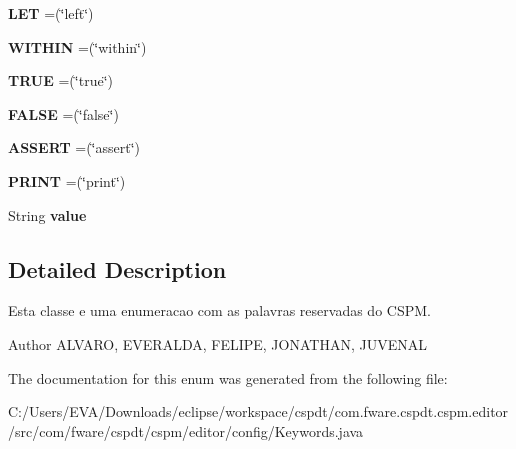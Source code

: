 \begin{DoxyCompactItemize}
{\bfseries L\+ET} =(\char`\"{}left\char`\"{})
\item 
\mbox{\label{enumcom_1_1fware_1_1cspdt_1_1cspm_1_1editor_1_1config_1_1_keywords_a9a9d91848c3ac1c5167186c4b0478b78}} 
{\bfseries W\+I\+T\+H\+IN} =(\char`\"{}within\char`\"{})
\item 
\mbox{\label{enumcom_1_1fware_1_1cspdt_1_1cspm_1_1editor_1_1config_1_1_keywords_acc916ea95813d42d83057eff6a926294}} 
{\bfseries T\+R\+UE} =(\char`\"{}true\char`\"{})
\item 
\mbox{\label{enumcom_1_1fware_1_1cspdt_1_1cspm_1_1editor_1_1config_1_1_keywords_ab0d4358a3cdc7b63c2ba01bd8a80f4cc}} 
{\bfseries F\+A\+L\+SE} =(\char`\"{}false\char`\"{})
\item 
\mbox{\label{enumcom_1_1fware_1_1cspdt_1_1cspm_1_1editor_1_1config_1_1_keywords_abc0f2cf4fa932fbccb28cdc1b2e8036c}} 
{\bfseries A\+S\+S\+E\+RT} =(\char`\"{}assert\char`\"{})
\item 
\mbox{\label{enumcom_1_1fware_1_1cspdt_1_1cspm_1_1editor_1_1config_1_1_keywords_a289b1aeb390232eb6e39535001468fd7}} 
{\bfseries P\+R\+I\+NT} =(\char`\"{}print\char`\"{})
\item 
\mbox{\label{enumcom_1_1fware_1_1cspdt_1_1cspm_1_1editor_1_1config_1_1_keywords_a323949d719e8a10d107cb709282152ef}} 
String {\bfseries value}
\end{DoxyCompactItemize}


\subsection{Detailed Description}
Esta classe e uma enumeracao com as palavras reservadas do C\+S\+PM. 

\begin{DoxyAuthor}{Author}
A\+L\+V\+A\+RO, E\+V\+E\+R\+A\+L\+DA, F\+E\+L\+I\+PE, J\+O\+N\+A\+T\+H\+AN, J\+U\+V\+E\+N\+AL 
\end{DoxyAuthor}


The documentation for this enum was generated from the following file\+:\begin{DoxyCompactItemize}
\item 
C\+:/\+Users/\+E\+V\+A/\+Downloads/eclipse/workspace/cspdt/com.\+fware.\+cspdt.\+cspm.\+editor/src/com/fware/cspdt/cspm/editor/config/Keywords.\+java\end{DoxyCompactItemize}
